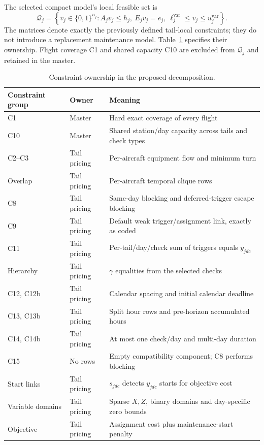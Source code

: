 The selected compact model's local feasible set is
\begin{equation}
 \mathcal Q_j=
 \left\{v_j\in\{0,1\}^{n_j}:
 A_jv_j\le h_j,\ E_jv_j=e_j,\ \ell_j^{\mathrm{var}}\le v_j\le u_j^{\mathrm{var}}
 \right\}.
 \label{eq:bp_local_set}
\end{equation}
The matrices denote exactly the previously defined tail-local constraints;
they do not introduce a replacement maintenance model. Table~\ref{tab:bp_split}
specifies their ownership. Flight coverage C1 and shared capacity C10 are
excluded from $\mathcal Q_j$ and retained in the master.

\begin{table}[htbp]
\centering\small
\caption{Constraint ownership in the proposed decomposition.}
\label{tab:bp_split}
\begin{tabularx}{\textwidth}{@{}p{}p{}X@{}}
\toprule
Constraint group & Owner & Meaning \\
\midrule
C1 & Master & Hard exact coverage of every flight \\
C10 & Master & Shared station/day capacity across tails and check types \\
C2--C3 & Tail pricing & Per-aircraft equipment flow and minimum turn \\
Overlap & Tail pricing & Per-aircraft temporal clique rows \\
C8 & Tail pricing & Same-day blocking and deferred-trigger escape blocking \\
C9 & Tail pricing & Default weak trigger/assignment link, exactly as coded \\
C11 & Tail pricing & Per-tail/day/check sum of triggers equals $y_{jdc}$ \\
Hierarchy & Tail pricing & $\gamma$ equalities from the selected checks \\
C12, C12b & Tail pricing & Calendar spacing and initial calendar deadline \\
C13, C13b & Tail pricing & Split hour rows and pre-horizon accumulated hours \\
C14, C14b & Tail pricing & At most one check/day and multi-day duration \\
C15 & No rows & Empty compatibility component; C8 performs blocking \\
Start links & Tail pricing & $s_{jdc}$ detects $y_{jdc}$ starts for objective cost \\
Variable domains & Tail pricing & Sparse $X,Z$, binary domains and day-specific zero bounds \\
Objective & Tail pricing & Assignment cost plus maintenance-start penalty \\
\bottomrule
\end{tabularx}
\end{table}

